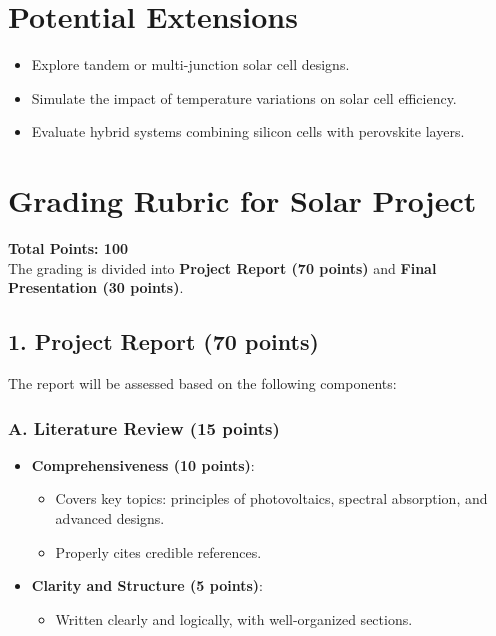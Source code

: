 \documentclass[11pt]{article}
\begin{document}
\section*{Potential Extensions}
\begin{itemize}
    \item Explore tandem or multi-junction solar cell designs.
    \item Simulate the impact of temperature variations on solar cell efficiency.
    \item Evaluate hybrid systems combining silicon cells with perovskite layers.
\end{itemize}

\section*{Grading Rubric for Solar Project}

\textbf{Total Points: 100}\\
The grading is divided into \textbf{Project Report (70 points)} and \textbf{Final Presentation (30 points)}.

\subsection*{1. Project Report (70 points)}
The report will be assessed based on the following components:

\subsubsection*{A. Literature Review (15 points)}
\begin{itemize}
    \item \textbf{Comprehensiveness (10 points)}:
    \begin{itemize}
        \item Covers key topics: principles of photovoltaics, spectral absorption, and advanced designs.
        \item Properly cites credible references.
    \end{itemize}
    \item \textbf{Clarity and Structure (5 points)}:
    \begin{itemize}
        \item Written clearly and logically, with well-organized sections.
    \end{itemize}
\end{itemize}
\end{document}
